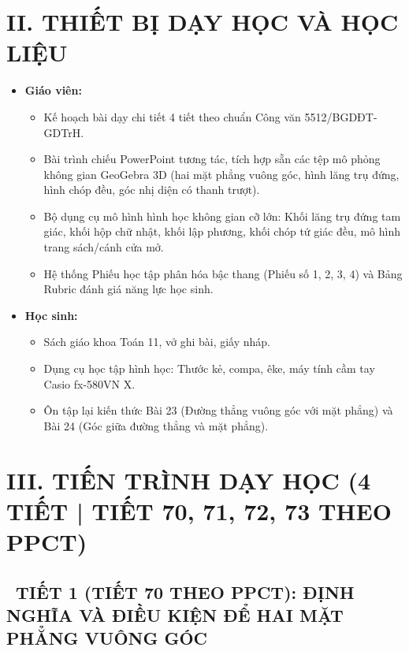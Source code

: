 \documentclass[12pt, a4paper]{article}
\begin{document}
\vspace{5pt}

\section*{II. THIẾT BỊ DẠY HỌC VÀ HỌC LIỆU}

\begin{itemize}[leftmargin=1.2cm]
    \item \textbf{Giáo viên:}
    \begin{itemize}[leftmargin=0.6cm]
        \item Kế hoạch bài dạy chi tiết 4 tiết theo chuẩn Công văn 5512/BGDĐT-GDTrH.
        \item Bài trình chiếu PowerPoint tương tác, tích hợp sẵn các tệp mô phỏng không gian GeoGebra 3D (hai mặt phẳng vuông góc, hình lăng trụ đứng, hình chóp đều, góc nhị diện có thanh trượt).
        \item Bộ dụng cụ mô hình hình học không gian cỡ lớn: Khối lăng trụ đứng tam giác, khối hộp chữ nhật, khối lập phương, khối chóp tứ giác đều, mô hình trang sách/cánh cửa mở.
        \item Hệ thống Phiếu học tập phân hóa bậc thang (Phiếu số 1, 2, 3, 4) và Bảng Rubric đánh giá năng lực học sinh.
    \end{itemize}
    \item \textbf{Học sinh:}
    \begin{itemize}[leftmargin=0.6cm]
        \item Sách giáo khoa Toán 11, vở ghi bài, giấy nháp.
        \item Dụng cụ học tập hình học: Thước kẻ, compa, êke, máy tính cầm tay Casio fx-580VN X.
        \item Ôn tập lại kiến thức Bài 23 (Đường thẳng vuông góc với mặt phẳng) và Bài 24 (Góc giữa đường thẳng và mặt phẳng).
    \end{itemize}
\end{itemize}

\vspace{5pt}

\section*{III. TIẾN TRÌNH DẠY HỌC (4 TIẾT | TIẾT 70, 71, 72, 73 THEO PPCT)}

\subsection*{\faClockO \ TIẾT 1 (TIẾT 70 THEO PPCT): ĐỊNH NGHĨA VÀ ĐIỀU KIỆN ĐỂ HAI MẶT PHẲNG VUÔNG GÓC}
\end{document}
